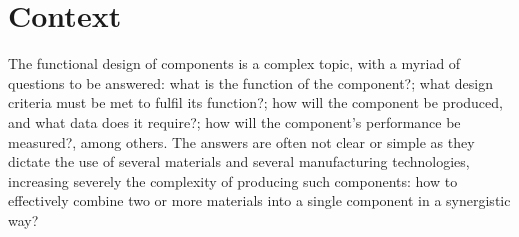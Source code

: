 %
\section{Context}
The functional design of components is a complex topic, with a myriad of
questions to be answered: what is the function of the component?; what design
criteria must be met to fulfil its function?; how will the component be
produced, and what data does it require?; how will the component's performance
be measured?, among others. The answers are often not clear or simple as they
dictate the use of several materials and several manufacturing technologies,
increasing severely the complexity of producing such components: how to
effectively combine two or more materials into a single component in a
synergistic way?

